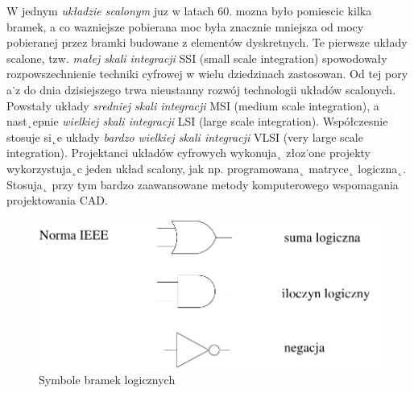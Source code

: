 \documentclass[a4paper,11pt]{article}
\begin{document}
W jednym \textsl{układzie scalonym} juz w latach 60. mozna było pomiescic kilka bramek, a co wazniejsze
pobierana moc była znacznie mniejsza od mocy pobieranej przez bramki budowane z elementów
dyskretnych. Te pierwsze układy scalone, tzw. \textsl{małej skali integracji} SSI (small scale
integration) spowodowały rozpowszechnienie techniki cyfrowej w wielu dziedzinach zastosowan.
Od tej pory a˙z do dnia dzisiejszego trwa nieustanny rozwój technologii układów scalonych. Powstały
układy \textsl{sredniej skali integracji} MSI (medium scale integration), a nast˛epnie \textsl{wielkiej skali
integracji} LSI (large scale integration). Współczesnie stosuje si˛e układy \textsl{bardzo wielkiej skali integracji}
VLSI (very large scale integration). Projektanci układów cyfrowych wykonuja˛ złoz˙one
projekty wykorzystuja˛c jeden układ scalony, jak np. programowana˛ matryce˛ logiczna˛. Stosuja˛
przy tym bardzo zaawansowane metody komputerowego wspomagania projektowania CAD.
\begin{figure}[!htb]
	\centerline{\includegraphics[scale=0.6]{symbole-bramek}}
	\caption{Symbole bramek logicznych}
	\label{fig:Symbole bramek logicznych}
\end{figure}
\end{document}
